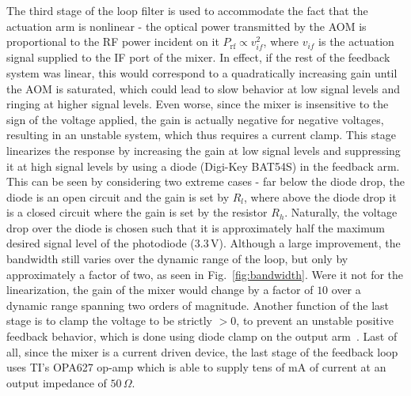 \documentclass[twocolumn,aps,pra,showpacs,preprintnumbers,bibnotes]{revtex4-1}
\begin{document}
The third stage of the loop filter is used to accommodate the fact that the actuation arm is nonlinear - the optical power transmitted by the AOM is proportional to the RF power incident on it $P_{\mathrm{rf}}\propto v_{if}^2$, where $v_{if}$ is the actuation signal supplied to the IF port of the mixer.
In effect, if the rest of the feedback system was linear, this would correspond to a quadratically increasing gain until the AOM is saturated, which could lead to slow behavior at low signal levels and ringing at higher signal levels.
Even worse, since the mixer is insensitive to the sign of the voltage applied, the gain is actually negative for negative voltages, resulting in an unstable system, which thus requires a current clamp.
This stage linearizes the response by increasing the gain at low signal levels and suppressing it at high signal levels by using a diode (Digi-Key BAT54S) in the feedback arm.
This can be seen by considering two extreme cases - far below the diode drop, the diode is an open circuit and the gain is set by $R_l$, where above the diode drop it is a closed circuit where the gain is set by the resistor $R_h$.
Naturally, the voltage drop over the diode is chosen such that it is approximately half the maximum desired signal level of the photodiode ($3.3\,$V).
Although a large improvement, the bandwidth still varies over the dynamic range of the loop, but only by approximately a factor of two, as seen in Fig.~\ref{fig:bandwidth}.
Were it not for the linearization, the gain of the mixer would change by a factor of $10$ over a dynamic range spanning two orders of magnitude.
Another function of the last stage is to clamp the voltage to be strictly $>0$, to prevent an unstable positive feedback behavior, which is done using diode clamp on the output arm~\cite{Horowitz2015}.
Last of all, since the mixer is a current driven device, the last stage of the feedback loop uses TI's OPA627 op-amp which is able to supply tens of mA of current at an output impedance of $50\,\Omega$.
\end{document}
